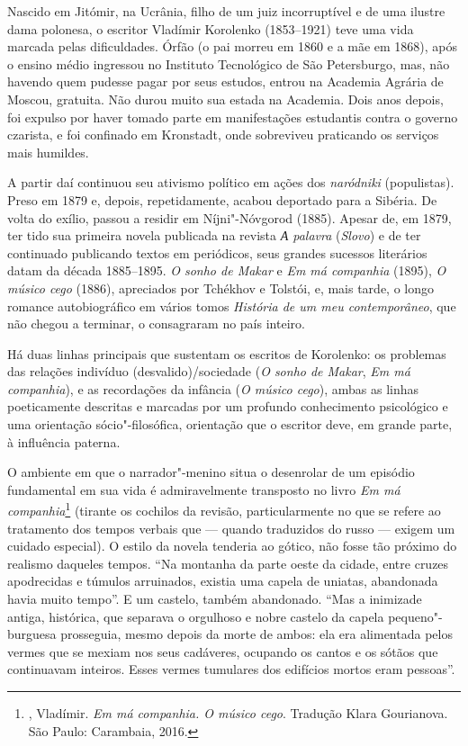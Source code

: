 {{Nascido em Jitómir, na Ucrânia, filho de um juiz incorruptível e de uma
ilustre dama polonesa, o escritor Vladímir Korolenko (1853--1921) teve
uma vida marcada pelas dificuldades. Órfão (o pai morreu em 1860 e a mãe
em 1868), após o ensino médio ingressou no Instituto Tecnológico de São
Petersburgo, mas, não havendo quem pudesse pagar por seus estudos,
entrou na Academia Agrária de Moscou, gratuita. Não durou muito sua
estada na Academia. Dois anos depois, foi expulso por haver
tomado parte em manifestações estudantis contra o governo czarista, e
foi confinado em Kronstadt, onde sobreviveu praticando os serviços mais
humildes.

A partir daí continuou seu ativismo político em ações dos
\emph{naródniki} (populistas). Preso em 1879 e, depois, repetidamente,
acabou deportado para a Sibéria. De volta do exílio, passou a residir em
Níjni"-Nóvgorod (1885). Apesar de, em 1879, ter tido sua primeira
novela publicada na revista \emph{А palavra} (\emph{Slovo}) e de ter
continuado publicando textos em periódicos, seus grandes sucessos
literários datam da década 1885--1895. \emph{O sonho de Makar} e \emph{Em
má companhia} (1895), \emph{O músico cego} (1886), apreciados por
Tchékhov e Tolstói, e, mais tarde, o longo romance autobiográfico em
vários tomos \emph{História de um meu contemporâneo}, que não chegou a
terminar, o consagraram no país inteiro.

Há duas linhas principais que sustentam os escritos de Korolenko: os
problemas das relações indivíduo (desvalido)/sociedade (\emph{O sonho de
Makar}, \emph{Em má companhia}), e as recordações da infância (\emph{O
músico cego}), ambas as linhas poeticamente descritas e marcadas por um
profundo conhecimento psicológico e uma orientação sócio"-filosófica,
orientação que o escritor deve, em grande parte, à influência paterna.

O ambiente em que o narrador"-menino situa o desenrolar de um episódio
fundamental em sua vida é admiravelmente transposto no livro \emph{Em má
companhia}\footnote{, Vladímir. \emph{Em má companhia. O músico
  cego}. Tradução Klara Gourianova. São Paulo: Carambaia, 2016.} (tirante
os cochilos da revisão, particularmente no que se refere ao tratamento
dos tempos verbais que --- quando traduzidos do russo --- exigem um
cuidado especial). O estilo da novela tenderia ao gótico, não fosse tão
próximo do realismo daqueles tempos. ``Na montanha da parte oeste da
cidade, entre cruzes apodrecidas e túmulos arruinados, existia uma
capela de uniatas, abandonada havia muito tempo''. E um castelo, também
abandonado. ``Mas a inimizade antiga, histórica, que separava o
orgulhoso e nobre castelo da capela pequeno"-burguesa prosseguia, mesmo
depois da morte de ambos: ela era alimentada pelos vermes que se mexiam
nos seus cadáveres, ocupando os cantos e os sótãos que continuavam
inteiros. Esses vermes tumulares dos edifícios mortos eram pessoas''.

}}
